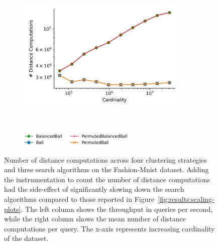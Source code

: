 \begin{figure}
\begin{subfigure}[b]{0.47\textwidth}
        \includegraphics[width=0.9\textwidth]{images/distance_counts/fashion-mnist_KnnDepthFirst_10_counts.png}
        \label{fig:results:radioml-counts-counts}
    \end{subfigure}%
    \\
    \begin{subfigure}[b]{0.94\textwidth}
        \centering
        \includegraphics[width=0.6\textwidth]{images/distance_counts/legend.png}
        \label{fig:results:counts-legend}
    \end{subfigure}%
    \caption{Number of distance computations across four clustering strategies and three search algorithms on the Fashion-Mnist dataset.
    Adding the instrumentation to count the number of distance computations had the side-effect of significantly slowing down the search algorithms compared to those reported in Figure~\ref{fig:results:scaling-plots}.
    The left column shows the throughput in queries per second, while the right column shows the mean number of distance computations per query.
    The x-axis represents increasing cardinality of the dataset.}
    \label{fig:results:distance-counts}
\end{figure}
